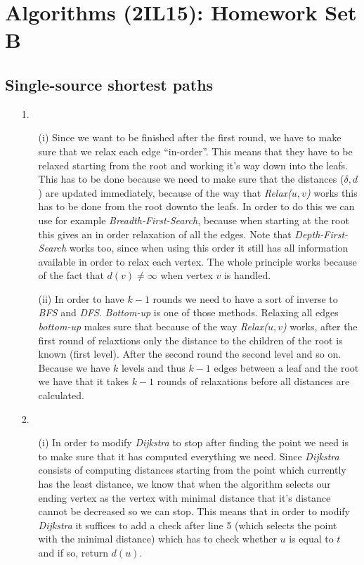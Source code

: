 \documentclass{article}
\title{}
\author{Mart Pluijmaekers, 0753117}
\date{27-5-2012}
\begin{document}
\maketitle
\section*{Algorithms (2IL15): Homework Set B}

\subsection*{Single-source shortest paths}
\begin{itemize}
\item[1.] 
\begin{itemize}
\item[(i)] Since we want to be finished after the first round, we have to make sure that we relax each edge ``in-order''. This means that they have to be relaxed starting from the root and working it's way down into the leafs. This has to be done because we need to make sure that the distances ($\delta,d$) are updated immediately, because of the way that \emph{Relax($u,v$)} works this has to be done from the root downto the leafs. In order to do this we can use for example \emph{Breadth-First-Search}, because when starting at the root this gives an in order relaxation of all the edges. Note that \emph{Depth-First-Search} works too, since when using this order it still has all information available in order to relax each vertex. The whole principle works because of the fact that $d(v)\ne \infty$ when vertex $v$ is handled.

\item[(ii)] In order to have $k-1$ rounds we need to have a sort of inverse to \emph{BFS} and \emph{DFS}. \emph{Bottom-up} is one of those methods. Relaxing all edges \emph{bottom-up} makes sure that because of the way \emph{Relax($u,v$)} works, after the first round of relaxtions only the distance to the children of the root is known (first level). After the second round the second level and so on. Because we have $k$ levels and thus $k-1$ edges between a leaf and the root we have that it takes $k-1$ rounds of relaxations before all distances are calculated. 
\end{itemize}

\item[2.] 
\begin{itemize}
\item[(i)] In order to modify \emph{Dijkstra} to stop after finding the point we need is to make sure that it has computed everything we need. Since \emph{Dijkstra} consists of computing distances starting from the point which currently has the least distance, we know that when the algorithm selects our ending vertex as the vertex with minimal distance that it's distance cannot be decreased so we can stop. This means that in order to modify \emph{Dijkstra} it suffices to add a check after line 5 (which selects the point with the minimal distance) which has to check whether $u$ is equal to $t$ and if so, return $d(u)$.


\end{itemize}
\end{itemize}
\end{document}
